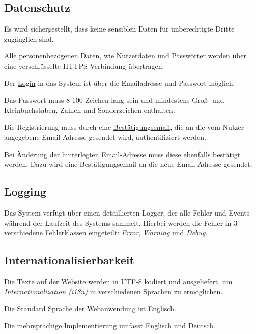 \subsection{Datenschutz}

\begin{description}
	 Es wird sichergestellt, dass keine sensiblen Daten für unberechtigte Dritte zugänglich sind.

	 Alle personenbezogenen Daten, wie Nutzerdaten und Passwörter werden über eine verschlüsselte HTTPS Verbindung übertragen.

	 Der \hyperref[funkt:080]{Login} in das System ist über die Emailadresse und Passwort möglich.

	 Das Passwort muss 8-100 Zeichen lang sein und mindestens Groß- und Kleinbuchstaben, Zahlen und Sonderzeichen enthalten.

	 Die Registrierung muss durch eine \hyperref[funkt:060]{Bestätigungsemail}, die an die vom Nutzer angegebene Email-Adresse gesendet wird, authentifiziert werden.

	 Bei Änderung der hinterlegten Email-Adresse muss diese ebenfalls bestätigt werden. Dazu wird eine Bestätigungsemail an die neue Email-Adresse gesendet.
\end{description}

\subsection{Logging}

\begin{description}
	 Das System verfügt über einen detaillierten Logger, der alle Fehler und Events während der Laufzeit des Systems sammelt. Hierbei werden die Fehler in 3 verschiedene Fehlerklassen eingeteilt: \emph{Error}, \emph{Warning} und \emph{Debug}.
\end{description}

\subsection{Internationalisierbarkeit}

\begin{description}
	 Die Texte auf der Website werden in UTF-8 kodiert
	und ausgeliefert, um \textit{Internationalization (i18n)} in verschiedenen Sprachen zu ermöglichen.

	 Die Standard Sprache der Webanwendung ist Englisch.

	 Die \hyperref[funkt:020]{mehrsprachige Implementierung} umfasst Englisch und Deutsch.
 \end{description}


